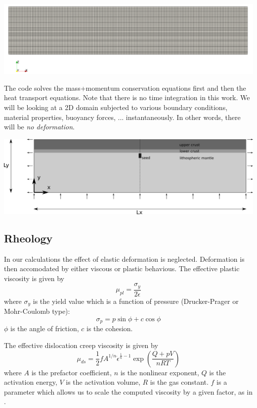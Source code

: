 \documentclass[a4paper]{article}
\begin{document}
\begin{center}
\includegraphics[width=15cm]{images/grid}
\end{center}

The code solves the mass+momentum conservation equations first and then the heat transport equations. 
Note that there is no time integration in this work. We will be looking at a 2D domain subjected to various boundary conditions, material properties, buoyancy forces, ... instantaneously. In other words, there will be {\it no deformation}.


\begin{center}
\includegraphics[width=15cm]{images/drawing}
\end{center}

\subsection{Rheology}

In our calculations the effect of elastic deformation is neglected. Deformation is then accomodated by either viscous or plastic behavious. The effective plastic viscosity is given by \cite{thie11,nabu15,spmw16}
\[
\mu_{pl} = \frac{\sigma_y}{2 \dot{\epsilon}}
\]
where $\sigma_y$ is the yield value which is a function of pressure (Drucker-Prager or Mohr-Coulomb type):
\[
\sigma_p = p \sin \phi + c \cos \phi
\]
$\phi$ is the angle of friction, $c$ is the cohesion. 

The effective dislocation creep viscosity is given by \cite{thie11}
\[
\mu_{ds}=\frac{1}{2} f A^{1/n} \dot{\epsilon}^{\frac{1}{n}-1} \exp \left( \frac{Q+pV}{nRT}  \right)
\]
where $A$ is the prefactor coefficient, $n$ is the nonlinear exponent, $Q$ is the activation energy, $V$ is the activation volume, $R$ is the gas constant. $f$ is a parameter which allows us to scale the computed viscosity by a given factor, as in \cite{hube11}.
\end{document}
